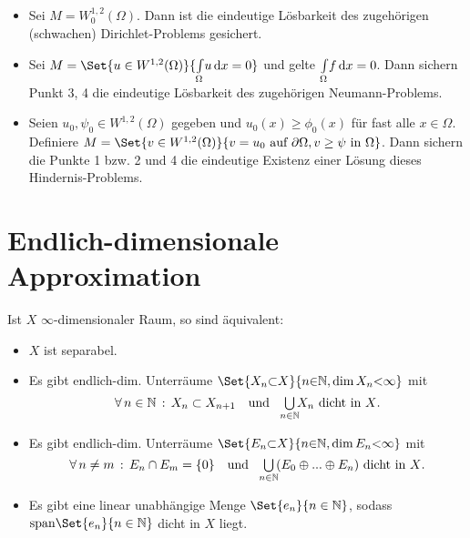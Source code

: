 \documentclass{cheat-sheet}
\begin{document}
\begin{samepage}

\begin{bsp}
  \begin{itemize}
    \item Sei $M = W_0^{1,2}(\Omega)$. Dann ist die eindeutige Lösbarkeit des zugehörigen (schwachen) Dirichlet-Problems gesichert.
    \item Sei $M = \Set{ u \in W^{1,2}(\Omega) }{ \Int{\Omega}{}{u}{x} = 0 }$ und gelte ${\textstyle \int\limits_{\Omega}^{}} f \,\mathrm{d} x = 0$. Dann sichern Punkt 3, 4 die eindeutige Lösbarkeit des zugehörigen Neumann-Problems.
    \item Seien $u_0, \psi_0 \in W^{1,2}(\Omega)$ gegeben und $u_0(x) \geq \phi_0(x)$ für fast alle $x \in \Omega$. Definiere $M = \Set{ v \in W^{1,2}(\Omega) }{ v = u_0 \text{ auf } \partial \Omega, v \geq \psi \text{ in } \Omega }$. Dann sichern die Punkte 1 bzw. 2 und 4 die eindeutige Existenz einer Lösung dieses Hindernis-Problems.
  \end{itemize}
\end{bsp}









\section{Endlich-dimensionale Approximation}

\end{samepage}


\begin{lem}
  Ist $X$ $\infty$-dimensionaler Raum, so sind äquivalent:
  \begin{itemize}
    \item $X$ ist separabel.
    \item Es gibt endlich-dim. Unterräume $\Set{X_n {\subset} X}{ n {\in} \N, \dim X_n {<} \infty }$ mit
    \[
      \fa{n \in \N} X_n \subset X_{n{+}1}
      \quad \text{und} \quad
      \bigcup_{\mathclap{n \in \N}} X_n \text{ dicht in $X$.}
    \]
    \item Es gibt endlich-dim. Unterräume $\Set{E_n {\subset} X}{ n {\in} \N, \dim E_n {<} \infty }$ mit
    \[
      \fa{n \not= m} E_n \cap E_m = \{0\}
      \quad \text{und} \quad
      \bigcup_{\mathclap{n \in \N}} \, (E_0 \oplus ... \oplus E_n) \text{ dicht in $X$.}
    \]
    \item Es gibt eine linear unabhängige Menge $\Set{ e_n }{ n \in \N }$, sodass $\mathrm{span}\Set{e_n}{ n \in \N }$ dicht in $X$ liegt.
  \end{itemize}
\end{lem}
\end{document}

